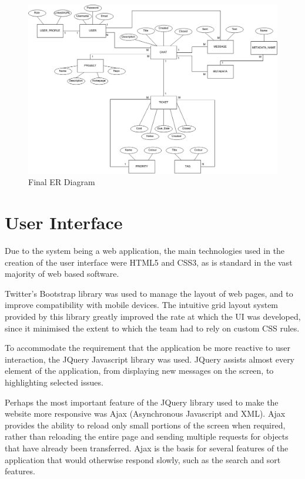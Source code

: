 \documentclass[a4paper]{l3proj}
\begin{document}
\begin{figure}[ht]
\includegraphics[scale=0.35]{newERdiagram}
\caption{Final ER Diagram}
\label{figure:ERDiagram}
\end{figure}
\section{User Interface}
\label{userInterface}

Due to the system being a web application, the main technologies used in the creation of the user interface were HTML5 and CSS3, as is standard in the vast majority of web based software. 

Twitter’s Bootstrap library was used to manage the layout of web pages, and to improve compatibility with mobile devices. The intuitive grid layout system provided by this library greatly improved the rate at which the UI was developed, since it minimised the extent to which the team had to rely on custom CSS rules.

To accommodate the requirement that the application be more reactive to user interaction, the JQuery Javascript library was used. JQuery assists almost every element of the application, from displaying new messages on the screen, to highlighting selected issues. 

Perhaps the most important feature of the JQuery library used to make the website more responsive was Ajax (Asynchronous Javascript and XML). Ajax provides the ability to reload only small portions of the screen when required, rather than reloading the entire page and sending multiple requests for objects that have already been transferred. Ajax is the basis for several features of the application that would otherwise respond slowly, such as the search and sort features.
\end{document}
